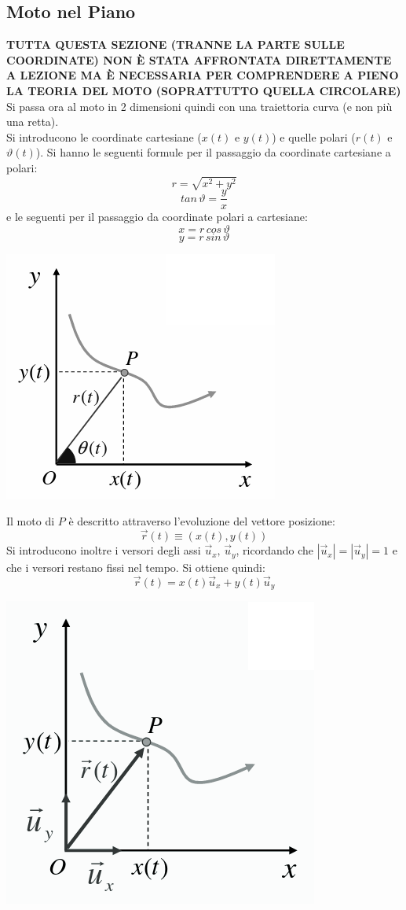 \documentclass[a4paper,12pt, oneside]{book}
\begin{document}
\subsection{Moto nel Piano}
\textbf{TUTTA QUESTA SEZIONE (TRANNE LA PARTE SULLE COORDINATE) NON È STATA AFFRONTATA DIRETTAMENTE A LEZIONE MA È NECESSARIA PER COMPRENDERE A PIENO LA TEORIA DEL MOTO (SOPRATTUTTO QUELLA CIRCOLARE)}\\
Si passa ora al moto in 2 dimensioni quindi con una traiettoria curva (e non più una retta).\\
Si introducono le coordinate cartesiane (${x}(t)$ e $y(t)$) e quelle polari ($r(t)$ e $\vartheta(t)$). Si hanno le seguenti formule per il passaggio da coordinate cartesiane a polari:
$$r=\sqrt{x^2+y^2}$$
$$tan\,\vartheta=\frac{y}{x}$$
e le seguenti per il passaggio da coordinate polari a cartesiane:
$$x=r\,cos\,\vartheta$$
$$y=r\,sin\,\vartheta$$
\begin{center}
\includegraphics[scale=0.4]{img/pia.png}
\end{center}
Il moto di $P$ è descritto attraverso l'evoluzione del vettore posizione:
$$\vec{r}(t)\equiv (x(t),y(t))$$
Si introducono inoltre i versori degli assi $\vec{u}_x,\,\vec{u}_y$, ricordando che $|\vec{u}_x|=|\vec{u}_y|=1$ e che i versori restano fissi nel tempo. Si ottiene quindi:
$$\vec{r}(t)=x(t)\vec{u}_x+y(t)\vec{u}_y$$
\begin{center}
\includegraphics[scale=0.4]{img/pia2.png}
\end{center}
\end{document}
